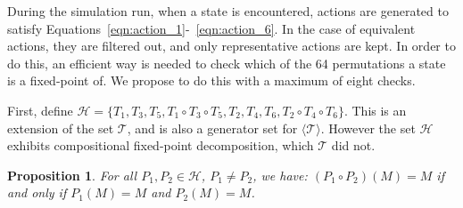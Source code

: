 \documentclass{article}
\newtheorem{proposition}{Proposition}
\begin{document}
During the simulation run, when a state is encountered, actions are generated to
satisfy Equations~\ref{eqn:action_1}-~\ref{eqn:action_6}.
In the case of equivalent actions, they are filtered out, and only
representative actions are kept.
In order to do this, an efficient way is needed to check which of the 64
permutations a state is a fixed-point of.
We propose to do this with a maximum of eight checks.

First, define $\mathcal{H} = \{T_1, T_3, T_5, T_1 \circ T_3 \circ T_5, T_2, T_4, T_6, T_2 \circ T_4 \circ T_6\}$.
This is an extension of the set $\mathcal{T}$, and is also a generator set for
$\langle\mathcal{T}\rangle$.
However the set $\mathcal{H}$ exhibits compositional fixed-point decomposition,
which $\mathcal{T}$ did not.

\begin{proposition}
For all $P_1, P_2 \in \mathcal{H}$, $P_1 \neq P_2$, we have:
$(P_1 \circ P_2)(M) = M$ if and only if $P_1(M) = M$ and $P_2(M) = M$.
\end{proposition}
\end{document}
